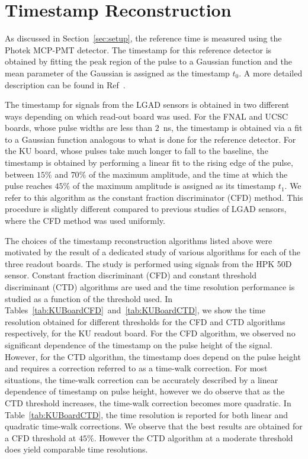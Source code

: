 \documentclass[preprint,1p]{elsarticle}
\begin{document}

\section{Timestamp Reconstruction}
\label{sec:timestampReco}

As discussed in Section~\ref{sec:setup}, the reference time
is measured using the Photek MCP-PMT detector. The timestamp
for this reference detector is obtained by fitting the 
peak region of the pulse to a Gaussian function and the
mean parameter of the Gaussian is assigned as the timestamp $t_0$. 
A more detailed description can be found in Ref~\cite{Anderson:2015gha}.

The timestamp for signals from the LGAD sensors is obtained in two different ways depending on
which read-out board was used. For the FNAL and UCSC boards,
whose pulse widths are less than $2$~ns, the timestamp is obtained via a fit to a 
Gaussian function analogous to what is done for the reference detector.
For the KU board, whose pulses take much longer to fall to the baseline, 
the timestamp is obtained by performing a linear fit to the
rising edge of the pulse, between $15\%$ and $70\%$ of the maximum amplitude, 
and the time at which the pulse reaches $45\%$ of the
maximum amplitude is assigned as its timestamp $t_1$. We refer to this algorithm as the
constant fraction discriminator (CFD) method. 
This procedure is slightly different compared to previous studies of LGAD sensors, 
where the CFD method was used uniformly.

The choices of the timestamp reconstruction algorithms listed above were
motivated by the result of a dedicated study of various algorithms for each of
the three readout boards. The study is performed using signals from the HPK 50D
sensor. Constant fraction discriminant (CFD) and constant threshold discriminant
(CTD) algorithms are used and the time resolution performance is studied as a
function of the threshold used. In
Tables~\ref{tab:KUBoardCFD}~and~\ref{tab:KUBoardCTD}, we show the time
resolution obtained for different thresholds for the CFD and CTD algorithms
respectively, for the KU readout board. For the CFD algorithm, we observed no
significant dependence of the timestamp on the pulse height of the signal.
However, for the CTD algorithm, the timestamp does depend on the pulse height
and requires a correction referred to as a time-walk correction. For most
situations, the time-walk correction can be accurately described by a linear
dependence of timestamp on pulse height, however we do observe that as the CTD threshold increases, the
time-walk correction becomes more quadratic. In Table~\ref{tab:KUBoardCTD}, the
time resolution is reported for both linear and quadratic time-walk corrections.
We observe that the best results are obtained for a CFD threshold at $45\%$.
However the CTD algorithm at a moderate threshold does yield comparable time
resolutions. 
\end{document}
